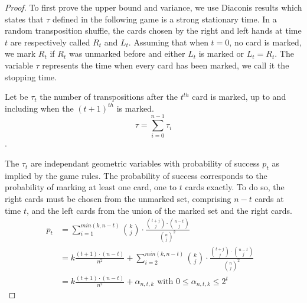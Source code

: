 \documentclass[a4paper]{article}
\begin{document}
\begin{proof}
To first prove the upper bound and variance, we use Diaconis\cite{} results which states that $\tau$ defined in the following game is a strong stationary time.
In a random transposition shuffle, the cards chosen by the right and left hands at time $t$ are respectively called $R_t$ and $L_t$. Assuming that when $t=0$, no card is marked, we mark $R_t$ if
$R_t$ was unmarked before and either $L_t$ is marked or $L_t = R_t$. The variable $\tau$ represents the time when every card has been marked, we call it the stopping time.

Let be $\tau_t$ the number of transpositions after the $t^{th}$ card is marked, up to and including when the $(t+1)^{th}$ is marked.
$$\tau = \sum_{i=0}^{n-1} \tau_i$$.

The $\tau_t$ are independant geometric variables with probability of success $p_t$ as implied by the game rules.
The probability of success corresponds to the probability of marking at least one card, one to $t$ cards exactly. To do so, the right cards must be chosen from the unmarked set, comprising $n-t$ cards at time $t$,
and the left cards from the union of the marked set and the right cards.
\begin{align*}
 p_t &= \sum_{i=1}^{min(k,n-t)} {k \choose j} \cdot \frac{ {t+j \choose j} \cdot {n-t \choose j} }{ {n \choose j}^2 }&\\
 &= k \frac{(t+1)\cdot(n-t)}{n^2} + \sum_{i=2}^{min(k,n-t)} {k \choose j} \cdot \frac{ {t+j \choose j} \cdot {n-t \choose j} }{ {n \choose j}^2 }&\\
 &= k \frac{(t+1)\cdot(n-t)}{n^2} + \alpha_{n,t,k} \text{ with } 0 \leq \alpha_{n,t,k} \leq 2^t
\end{align*}


\end{proof}
\end{document}
